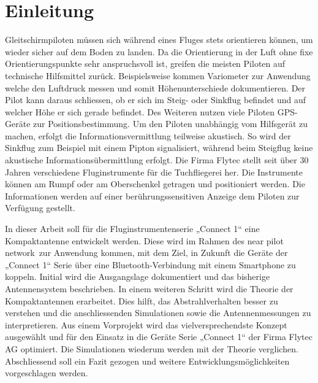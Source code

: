 \newpage
\section{Einleitung}
Gleitschirmpiloten müssen sich während eines Fluges stets orientieren können, um wieder sicher auf dem Boden zu landen. Da die Orientierung in der Luft ohne fixe Orientierungspunkte sehr anspruchsvoll ist, greifen die meisten Piloten auf technische Hilfsmittel zurück. Beispielsweise kommen Variometer zur Anwendung welche den Luftdruck messen und somit Höhenunterschiede dokumentieren. Der Pilot kann daraus schliessen, ob er sich im Steig- oder Sinkflug befindet und auf welcher Höhe er sich gerade befindet. Des Weiteren nutzen viele Piloten GPS-Geräte zur Positionsbestimmung. Um den Piloten unabhängig vom Hilfsgerät zu machen, erfolgt die Informationsvermittlung teilweise akustisch. So wird der Sinkflug zum Beispiel mit einem Pipton signalisiert, während beim Steigflug keine akustische Informationsübermittlung erfolgt. Die Firma Flytec stellt seit über 30 Jahren verschiedene Fluginstrumente für die Tuchfliegerei her. Die Instrumente können am Rumpf oder am Oberschenkel getragen und positioniert werden. Die Informationen werden auf einer berührungssensitiven Anzeige dem Piloten zur Verfügung gestellt. 

In dieser Arbeit soll für die Fluginstrumentenserie „Connect 1“ eine Kompaktantenne entwickelt werden. Diese wird im Rahmen des \glqq near pilot network\grqq \ zur Anwendung kommen, mit dem Ziel, in Zukunft die Geräte der „Connect 1“ Serie über eine Bluetooth-Verbindung mit einem Smartphone zu koppeln. Initial wird die Ausgangslage dokumentiert und das bisherige Antennensystem beschrieben. In einem weiteren Schritt wird die Theorie der Kompaktantennen erarbeitet. Dies hilft, das Abstrahlverhalten besser zu verstehen und die anschliessenden Simulationen sowie die Antennenmessungen zu interpretieren. Aus einem Vorprojekt wird das vielversprechendste Konzept ausgewählt und für den Einsatz in die Geräte Serie „Connect 1“ der Firma Flytec AG optimiert. Die Simulationen wiederum werden mit der Theorie verglichen. Abschliessend soll ein Fazit gezogen und weitere Entwicklungsmöglichkeiten vorgeschlagen werden.

